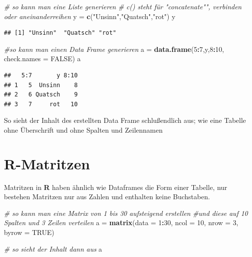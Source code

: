 \documentclass[]{book}
\newenvironment{Shaded}{\begin{snugshade}}{\end{snugshade}}
\newcommand{\KeywordTok}[1]{\textcolor[rgb]{0.13,0.29,0.53}{\textbf{#1}}}
\newcommand{\DataTypeTok}[1]{\textcolor[rgb]{0.13,0.29,0.53}{#1}}
\newcommand{\DecValTok}[1]{\textcolor[rgb]{0.00,0.00,0.81}{#1}}
\newcommand{\StringTok}[1]{\textcolor[rgb]{0.31,0.60,0.02}{#1}}
\newcommand{\CommentTok}[1]{\textcolor[rgb]{0.56,0.35,0.01}{\textit{#1}}}
\newcommand{\OtherTok}[1]{\textcolor[rgb]{0.56,0.35,0.01}{#1}}
\newcommand{\OperatorTok}[1]{\textcolor[rgb]{0.81,0.36,0.00}{\textbf{#1}}}
\newcommand{\NormalTok}[1]{#1}
\begin{document}
\begin{Shaded}
\begin{Highlighting}[]
\CommentTok{# so kann man eine Liste generieren}
\CommentTok{# c() steht für "concatenate"", verbinden oder aneinanderreihen }
\NormalTok{y =}\StringTok{ }\KeywordTok{c}\NormalTok{(}\StringTok{"Unsinn"}\NormalTok{,}\StringTok{"Quatsch"}\NormalTok{,}\StringTok{"rot"}\NormalTok{)}
\NormalTok{y}
\end{Highlighting}
\end{Shaded}

\begin{verbatim}
## [1] "Unsinn"  "Quatsch" "rot"
\end{verbatim}

\begin{Shaded}
\begin{Highlighting}[]
\CommentTok{#so kann man einen Data Frame generieren }
\NormalTok{a =}\StringTok{ }\KeywordTok{data.frame}\NormalTok{(}\DecValTok{5}\OperatorTok{:}\DecValTok{7}\NormalTok{,y,}\DecValTok{8}\OperatorTok{:}\DecValTok{10}\NormalTok{, }\DataTypeTok{check.names =} \OtherTok{FALSE}\NormalTok{)}
\NormalTok{a}
\end{Highlighting}
\end{Shaded}

\begin{verbatim}
##   5:7       y 8:10
## 1   5  Unsinn    8
## 2   6 Quatsch    9
## 3   7     rot   10
\end{verbatim}

So sieht der Inhalt des erstellten Data Frame schlußendlich aus; wie
eine Tabelle ohne Überschrift und ohne Spalten und Zeilennamen

\section{R-Matritzen}\label{r-matritzen}

Matritzen in \textbf{R} haben ähnlich wie Dataframes die Form einer
Tabelle, nur bestehen Matritzen nur aus Zahlen und enthalten keine
Buchstaben.

\begin{Shaded}
\begin{Highlighting}[]
\CommentTok{# so kann man eine Matrix von 1 bis 30 aufsteigend erstellen }
\CommentTok{#und diese auf 10 Spalten und 3 Zeilen verteilen}
\NormalTok{a =}\StringTok{ }\KeywordTok{matrix}\NormalTok{(}\DataTypeTok{data =} \DecValTok{1}\OperatorTok{:}\DecValTok{30}\NormalTok{, }\DataTypeTok{ncol =} \DecValTok{10}\NormalTok{, }\DataTypeTok{nrow =} \DecValTok{3}\NormalTok{, }\DataTypeTok{byrow =} \OtherTok{TRUE}\NormalTok{)}

\CommentTok{# so sieht der Inhalt dann aus}
\NormalTok{a}
\end{Highlighting}
\end{Shaded}
\end{document}
